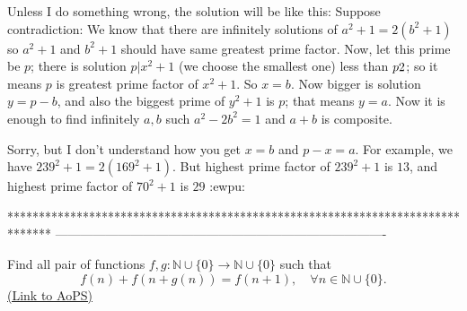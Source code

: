 \begin{solution}
	\begin{tcolorbox}Unless I do something wrong, the solution will be like this:
Suppose contradiction:
We know that there are infinitely solutions of $a^2+1=2(b^2+1)$ so $a^2+1$ and $b^2+1$ should have same greatest prime factor. Now, let this prime be $p$; there is solution $p|x^2+1$ (we choose the smallest one) less than $p\/2$; so it means $p$ is greatest prime factor of $x^2+1$. So $x=b$. Now bigger is solution $y=p-b$, and also the biggest prime of $y^2+1$ is $p$; that means $y=a$. Now it is enough to find infinitely $a, b$ such $a^2-2b^2=1$ and $a+b$ is composite. \end{tcolorbox}

Sorry, but I don't understand how you get $x = b$ and $p-x = a$. For example, we have $239^2 + 1 = 2(169^2+1)$. But highest prime factor of $239^2+1$ is $13$, and highest prime factor of $70^2+1$ is $29$ :ewpu:


\end{solution}
*******************************************************************************
-------------------------------------------------------------------------------

\begin{problem}
	Find all pair of functions $ f,g : \mathbb{N}\cup \{0\} \to\mathbb{N} \cup \{0\}$ such that
\[ f(n) + f(n + g(n)) = f(n+1), \quad \forall n \in \mathbb{N} \cup \{0\}.\]
	\flushright \href{https://artofproblemsolving.com/community/c6h404408}{(Link to AoPS)}
\end{problem}



